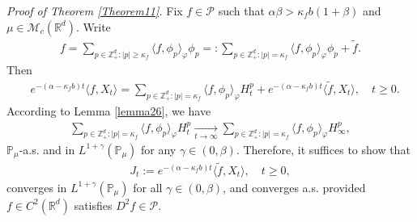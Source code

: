 \documentclass[12pt,a4paper]{amsart}
\theoremstyle{plain}
\theoremstyle{definition}
\numberwithin{equation}{section}
\begin{document}
    {\it Proof of Theorem \ref{Theorem11}.}\quad
	Fix  $f \in \mathcal P$ such that $\alpha \beta > \kappa_f b (1+\beta)$ and $\mu \in \mathcal M_c(\mathbb R^d)$.
	Write
\begin{equation}\begin{split}
    f
    =\sum_{p\in \mathbb Z_+^d:|p|\geq \kappa_f}\langle f,\phi_p\rangle_\varphi \phi_p
    =:
    \sum_{p\in \mathbb Z_+^d:|p|= \kappa_f}\langle f,\phi_p\rangle_\varphi \phi_p+\tilde{f}.
\end{split}\end{equation}
	Then
\begin{align*}
    &e^{-(\alpha-\kappa_fb)t}\langle f,X_t\rangle=
    \sum_{p\in \mathbb Z_+^d:|p|= \kappa_f}\langle f,\phi_p\rangle_\varphi H_t^p+e^{-(\alpha-\kappa_fb)t} \langle \tilde{f},X_t\rangle,
    \quad t\geq 0.
\end{align*}
	According to Lemma \ref{lemma26},
	we have
\begin{equation}\begin{split}
\label{as convergence}
    \sum_{p\in \mathbb{Z}_+^d:|p|= \kappa_f}\langle f,\phi_p\rangle_\varphi H_t^p
    \xrightarrow[t\to \infty]{} \sum_{p\in \mathbb{Z}_+^d:|p|=\kappa_f}\langle f, \phi_p\rangle_{\varphi} H_{\infty}^p,
\end{split}\end{equation}
    $\mathbb{P}_{\mu}$-a.s. and in $L^{1+\gamma}(\mathbb{P}_{\mu})$ for any $\gamma\in(0,\beta)$.
	Therefore, it suffices to show that
\begin{equation}\begin{split}
    J_t
    :=e^{-(\alpha-\kappa_fb)t}\langle \tilde{f},X_t\rangle,
    \quad t\geq 0,
\end{split}\end{equation}
	converges in $L^{1+\gamma}(\mathbb{P}_{\mu})$ for all $\gamma\in(0,\beta)$, and converges a.s. provided $f\in C^2(\mathbb R^d)$ satisfies $D^2f\in \mathcal{P}$.
\end{document}
